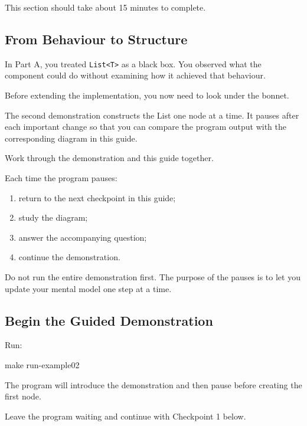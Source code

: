\documentclass{csc2059practical}
\begin{document}
\begin{infobox}
This section should take about 15 minutes to complete.
\end{infobox}


\subsection{From Behaviour to Structure}

In Part A, you treated \texttt{List<T>} as a black box. You observed what the component could do without examining how it achieved that behaviour.

Before extending the implementation, you now need to look under the bonnet.

The second demonstration constructs the List one node at a time. It pauses after each important change so that you can compare the program output with the corresponding diagram in this guide.

\begin{importantnote}
Work through the demonstration and this guide together.

Each time the program pauses:

\begin{enumerate}
    \item return to the next checkpoint in this guide;
    \item study the diagram;
    \item answer the accompanying question;
    \item continue the demonstration.
\end{enumerate}

Do not run the entire demonstration first. The purpose of the pauses is to let you update your mental model one step at a time.
\end{importantnote}

\subsection{Begin the Guided Demonstration}

Run:

\begin{terminal}
make run-example02
\end{terminal}

The program will introduce the demonstration and then pause before creating the first node.

Leave the program waiting and continue with Checkpoint 1 below.
\end{document}
